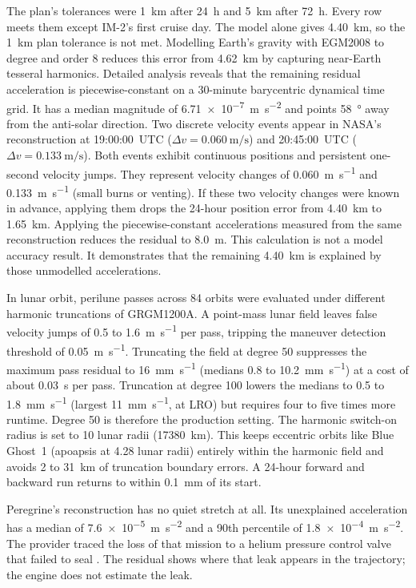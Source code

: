 \documentclass[11pt,a4paper]{article}
\begin{document}
The plan's tolerances were \qty{1}{\km} after \qty{24}{\hour} and \qty{5}{\km} after
\qty{72}{\hour}. Every row meets them except IM-2's first cruise day. The model alone gives \qty{4.40}{\km},
so the \qty{1}{\km} plan tolerance is not met. Modelling Earth's gravity with EGM2008 to degree and
order 8 reduces this error from \qty{4.62}{\km} by capturing near-Earth tesseral harmonics.
Detailed analysis reveals that the remaining residual acceleration is piecewise-constant on a
30-minute barycentric dynamical time grid. It has a median magnitude of
\qty{6.71e-7}{\m\per\s\squared} and points \qty{58}{\degree} away from the anti-solar direction.
Two discrete velocity events appear in NASA's reconstruction at 19:00:00~UTC
($\Delta v = \qty{0.060}{\m\per\s}$) and 20:45:00~UTC ($\Delta v = \qty{0.133}{\m\per\s}$).
Both events exhibit continuous positions and persistent one-second velocity jumps. They represent
velocity changes of \qty{0.060}{\m\per\s} and \qty{0.133}{\m\per\s} (small burns or venting).
If these two velocity changes were known in advance, applying them drops the 24-hour position
error from \qty{4.40}{\km} to \qty{1.65}{\km}. Applying the piecewise-constant accelerations
measured from the same reconstruction reduces the residual to \qty{8.0}{\m}. This calculation
is not a model accuracy result. It demonstrates that the remaining \qty{4.40}{\km} is explained
by those unmodelled accelerations.

In lunar orbit, perilune passes across 84 orbits were evaluated under different harmonic
truncations of GRGM1200A. A point-mass lunar field leaves false velocity jumps of 0.5 to
\qty{1.6}{\m\per\s} per pass, tripping the maneuver detection threshold of
\qty{0.05}{\m\per\s}. Truncating the field at degree 50 suppresses the maximum pass
residual to \qty{16}{\mm\per\s} (medians 0.8 to \qty{10.2}{\mm\per\s}) at a cost of about
\qty{0.03}{\s} per pass. Truncation at degree 100 lowers the medians to 0.5 to
\qty{1.8}{\mm\per\s} (largest \qty{11}{\mm\per\s}, at LRO) but requires four to five times
more runtime. Degree 50 is therefore the production setting.
The harmonic switch-on radius is set to 10 lunar radii (\qty{17380}{\km}). This keeps
eccentric orbits like Blue Ghost~1 (apoapsis at 4.28 lunar radii) entirely within the
harmonic field and avoids 2 to \qty{31}{\km} of truncation boundary errors. A 24-hour
forward and backward run returns to within \qty{0.1}{\mm} of its start.

Peregrine's reconstruction has no quiet stretch at all. Its unexplained acceleration has
a median of \qty{7.6e-5}{\m\per\s\squared} and a 90th percentile of
\qty{1.8e-4}{\m\per\s\squared}. The provider traced the loss of that mission to a
helium pressure control valve that failed to seal \citep{astrobotic2024}. The residual
shows where that leak appears in the trajectory; the engine does not estimate the leak.
\end{document}
